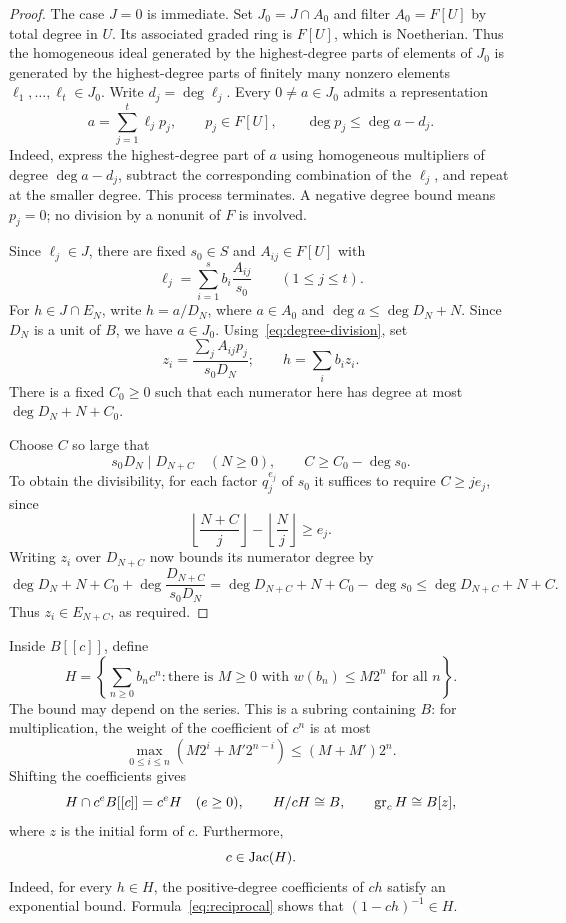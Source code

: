 \begin{proof}
The case $J=0$ is immediate. Set $J_0=J\cap A_0$ and filter
$A_0=F[U]$ by total degree in $U$. Its associated graded ring is
$F[U]$, which is Noetherian. Thus the homogeneous ideal generated
by the highest-degree parts of elements of $J_0$ is generated by
the highest-degree parts of finitely many nonzero elements
$\ell_1,\ldots,\ell_t\in J_0$. Write $d_j=\deg\ell_j$.
Every $0\ne a\in J_0$ admits a representation
\begin{equation}\label{eq:degree-division}
 a=\sum_{j=1}^{t}\ell_jp_j,\qquad
 p_j\in F[U],\qquad \deg p_j\le\deg a-d_j.
\end{equation}
Indeed, express the highest-degree part of $a$ using homogeneous
multipliers of degree $\deg a-d_j$, subtract the corresponding
combination of the $\ell_j$, and repeat at the smaller degree.
This process terminates. A negative degree bound means $p_j=0$;
no division by a nonunit of $F$ is involved.

Since $\ell_j\in J$, there are fixed $s_0\in S$ and
$A_{ij}\in F[U]$ with
\[
 \ell_j=\sum_{i=1}^{s}b_i\frac{A_{ij}}{s_0}
 \qquad(1\le j\le t).
\]
For $h\in J\cap E_N$, write $h=a/D_N$, where
$a\in A_0$ and $\deg a\le\deg D_N+N$.
Since $D_N$ is a unit of $B$, we have $a\in J_0$.
Using~\eqref{eq:degree-division}, set
\[
 z_i=\frac{\sum_j A_{ij}p_j}{s_0D_N};
 \qquad h=\sum_i b_i z_i.
\]
There is a fixed $C_0\ge0$ such that each numerator here has degree
at most $\deg D_N+N+C_0$.

Choose $C$ so large that
\begin{equation}\label{eq:denominator-shift}
 s_0D_N\mid D_{N+C}\quad(N\ge0),\qquad C\ge C_0-\deg s_0.
\end{equation}
To obtain the divisibility, for each factor $q_j^{e_j}$ of $s_0$
it suffices to require $C\ge je_j$, since
\[
 \left\lfloor\frac{N+C}{j}\right\rfloor
 -\left\lfloor\frac{N}{j}\right\rfloor\ge e_j.
\]
Writing $z_i$ over $D_{N+C}$ now bounds its numerator degree by
\[
 \deg D_N+N+C_0+\deg\frac{D_{N+C}}{s_0D_N}
 =\deg D_{N+C}+N+C_0-\deg s_0
 \le\deg D_{N+C}+N+C.
\]
Thus $z_i\in E_{N+C}$, as required.
\end{proof}

Inside $B[[c]]$, define
\begin{equation}\label{eq:H}
 H=\left\{\sum_{n\ge0}b_nc^n:
       \text{there is }M\ge0\text{ with }w(b_n)\le M2^n
       \text{ for all }n\right\}.
\end{equation}
The bound may depend on the series. This is a subring containing
$B$: for multiplication, the weight of the coefficient of $c^n$
is at most
\[
 \max_{0\le i\le n}(M2^i+M'2^{n-i})\le(M+M')2^n.
\]
Shifting the coefficients gives
\begin{equation}\label{eq:Hgraded}
 H\cap c^eB[[c]]=c^eH\quad(e\ge0),\qquad
 H/cH\cong B,\qquad \operatorname{gr}_cH\cong B[z],
\end{equation}
where $z$ is the initial form of $c$. Furthermore,
\begin{equation}\label{eq:jacobson}
 c\in\operatorname{Jac}(H).
\end{equation}
Indeed, for every $h\in H$, the positive-degree coefficients of
$ch$ satisfy an exponential bound. Formula~\eqref{eq:reciprocal}
shows that $(1-ch)^{-1}\in H$.

